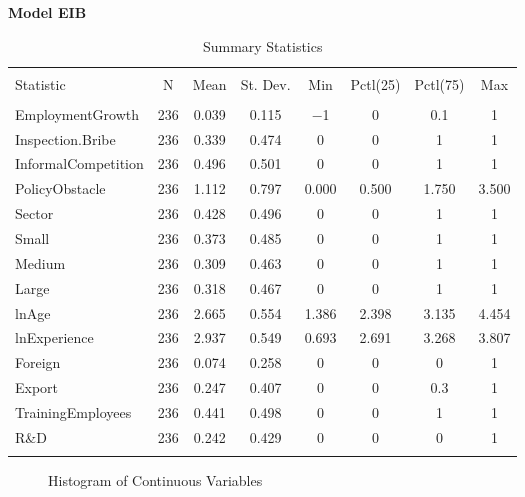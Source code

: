 \textbf{\Large Model EIB}

\begin{table}[H] \centering 
  \caption*{Summary Statistics} 
\begin{tabular}{@{\extracolsep{5pt}}lccccccc} 
\\[-1.8ex]\hline 
\hline \\[-1.8ex] 
Statistic & \multicolumn{1}{c}{N} & \multicolumn{1}{c}{Mean} & \multicolumn{1}{c}{St. Dev.} & \multicolumn{1}{c}{Min} & \multicolumn{1}{c}{Pctl(25)} & \multicolumn{1}{c}{Pctl(75)} & \multicolumn{1}{c}{Max} \\ 
\hline \\[-1.8ex] 
EmploymentGrowth & 236 & 0.039 & 0.115 & $-$1 & 0 & 0.1 & 1 \\ 
Inspection.Bribe & 236 & 0.339 & 0.474 & 0 & 0 & 1 & 1 \\ 
InformalCompetition & 236 & 0.496 & 0.501 & 0 & 0 & 1 & 1 \\ 
PolicyObstacle & 236 & 1.112 & 0.797 & 0.000 & 0.500 & 1.750 & 3.500 \\ 
Sector & 236 & 0.428 & 0.496 & 0 & 0 & 1 & 1 \\ 
Small & 236 & 0.373 & 0.485 & 0 & 0 & 1 & 1 \\ 
Medium & 236 & 0.309 & 0.463 & 0 & 0 & 1 & 1 \\ 
Large & 236 & 0.318 & 0.467 & 0 & 0 & 1 & 1 \\ 
lnAge & 236 & 2.665 & 0.554 & 1.386 & 2.398 & 3.135 & 4.454 \\ 
lnExperience & 236 & 2.937 & 0.549 & 0.693 & 2.691 & 3.268 & 3.807 \\ 
Foreign & 236 & 0.074 & 0.258 & 0 & 0 & 0 & 1 \\ 
Export & 236 & 0.247 & 0.407 & 0 & 0 & 0.3 & 1 \\ 
TrainingEmployees & 236 & 0.441 & 0.498 & 0 & 0 & 1 & 1 \\ 
R\&D & 236 & 0.242 & 0.429 & 0 & 0 & 0 & 1 \\ 
\hline \\[-1.8ex] 
\end{tabular} 
\end{table} 

\begin{figure}[H]%
    \centering
    \begin{subfigure}
    \texttt{[image: chinchilab-template/Pictures/Model2.3\_hist\_a.png]}
    \end{subfigure}
    \begin{subfigure}
    \texttt{[image: chinchilab-template/Pictures/Model2.3\_hist\_b.png]}
    \end{subfigure}
    \begin{subfigure}
    \texttt{[image: chinchilab-template/Pictures/Model2.3\_hist\_c.png]}
    \end{subfigure}
    \begin{subfigure}
    \texttt{[image: chinchilab-template/Pictures/Model2.3\_hist\_d.png]}
    \end{subfigure}
    \caption*{Histogram of Continuous Variables}%
\end{figure}

